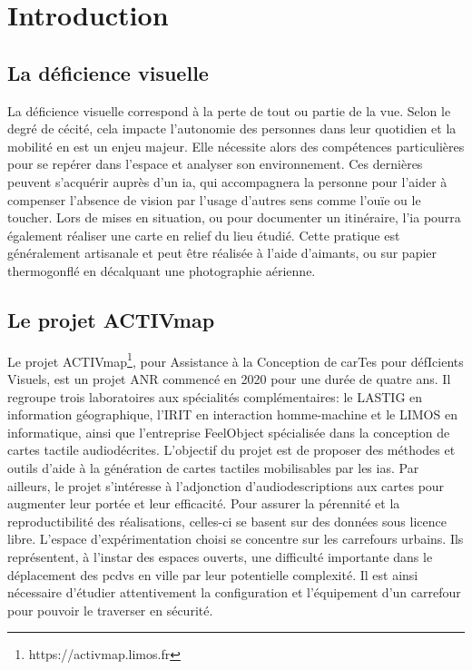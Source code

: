 \chapter*{Introduction}



\section*{La déficience visuelle}

La déficience visuelle correspond à la perte de tout ou partie de la vue. Selon le degré de cécité, cela impacte l’autonomie des personnes dans leur quotidien et la mobilité en est un enjeu majeur. Elle nécessite alors des compétences particulières pour se repérer dans l'espace et analyser son environnement. Ces dernières peuvent s'acquérir auprès d'un \gls{ia}, qui accompagnera la personne pour l'aider à compenser l'absence de vision par l'usage d'autres sens comme l'ouïe ou le toucher. Lors de mises en situation, ou pour documenter un itinéraire, l'\gls{ia} pourra également réaliser une carte en relief du lieu étudié. Cette pratique est généralement artisanale et peut être réalisée à l'aide d'aimants, ou sur papier thermogonflé en décalquant une photographie aérienne.


\section*{Le projet ACTIVmap}

Le projet ACTIVmap\footnote{https://activmap.limos.fr}, pour Assistance à la Conception de carTes pour défIcients Visuels, est un projet ANR commencé en 2020 pour une durée de quatre ans. Il regroupe trois laboratoires aux spécialités complémentaires: le LASTIG en information géographique, l'IRIT en interaction homme-machine et le LIMOS en informatique, ainsi que l'entreprise FeelObject spécialisée dans la conception de cartes tactile audiodécrites. L'objectif du projet est de proposer des méthodes et outils d'aide à la génération de cartes tactiles mobilisables par les \glspl{ia}. Par ailleurs, le projet s'intéresse à l'adjonction d'audiodescriptions aux cartes pour augmenter leur portée et leur efficacité. Pour assurer la pérennité et la reproductibilité des réalisations, celles-ci se basent sur des données sous licence libre. L'espace d'expérimentation choisi se concentre sur les carrefours urbains. Ils représentent, à l'instar des espaces ouverts, une difficulté importante dans le déplacement des \glspl{pcdv} en ville par leur potentielle complexité. Il est ainsi nécessaire d'étudier attentivement la configuration et l'équipement d'un carrefour pour pouvoir le traverser en sécurité.

